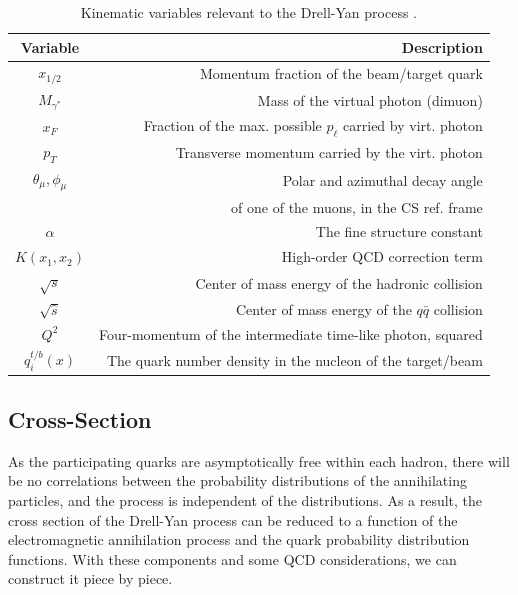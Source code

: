 \begin{table}[h]
	\centering
	\begin{tabular}{c|r}
		Variable&Description\\ \hline \hline
		$x_{1/2}$ & Momentum fraction of the beam/target quark\\
		$M_{\gamma^*}$ & Mass of the virtual photon (dimuon)\\
		$x_F$ & Fraction of the max. possible $p_{\ell}$ carried by virt. photon\\
		$p_T$ & Transverse momentum carried by the virt. photon\\
		$\theta_{\mu}, \phi_{\mu}$ & Polar and azimuthal decay angle\\ & of one of the muons, in the CS ref. frame\\ \hline
		$\alpha$ & The fine structure constant \\
		$K(x_1,x_2)$ & High-order QCD correction term \\
		$\sqrt{s}$ & Center of mass energy of the hadronic collision \\
		$\sqrt{\hat{s}}$ & Center of mass energy of the $q\bar{q}$ collision \\
		$Q^{2}$ & Four-momentum of the intermediate time-like photon, squared \\ 
		$q_i^{t/b}(x)$ & The quark number density in the nucleon of the target/beam \\ \hline \hline
	\end{tabular}
	\caption{Kinematic variables relevant to the Drell-Yan process .}
	\label{tab:var}
\end{table}

\subsection{Cross-Section}

As the participating quarks are asymptotically free within each hadron, there will be no correlations between the probability distributions of the annihilating particles, and the process is independent of the distributions. As a result, the cross section of the Drell-Yan process can be reduced to a function of the electromagnetic annihilation process and the quark probability distribution functions. With these components and some QCD considerations, we can construct it piece by piece.


